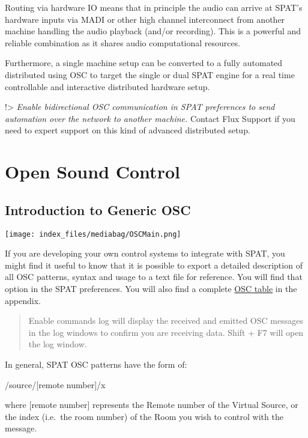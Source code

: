 \documentclass[
  letterpaper,
  DIV=11,
  numbers=noendperiod]{scrreport}
\begin{document}
Routing via hardware IO means that in principle the audio can arrive at
SPAT's hardware inputs via MADI or other high channel interconnect from
another machine handling the audio playback (and/or recording). This is
a powerful and reliable combination as it shares audio computational
resources.

Furthermore, a single machine setup can be converted to a fully
automated distributed using OSC to target the single or dual SPAT engine
for a real time controllable and interactive distributed hardware setup.

!\textgreater{} \emph{Enable bidirectional OSC communication in SPAT
preferences to send automation over the network to another machine.}
Contact Flux Support if you need to expert support on this kind of
advanced distributed setup.

\hypertarget{open-sound-control}{%
\chapter{Open Sound Control}\label{open-sound-control}}

\hypertarget{introduction-to-generic-osc}{%
\section{Introduction to Generic
OSC}\label{introduction-to-generic-osc}}

\texttt{[image: index\_files/mediabag/OSCMain.png]}

If you are developing your own control systems to integrate with SPAT,
you might find it useful to know that it is possible to export a
detailed description of all OSC patterns, syntax and usage to a text
file for reference. You will find that option in the SPAT preferences.
You will also find a complete \href{Appendix_C_OSC_Table.md}{OSC table}
in the appendix.

\begin{quote}
Enable commands log will display the received and emitted OSC messages
in the log windows to confirm you are receiving data. Shift + F7 will
open the log window.
\end{quote}

In general, SPAT OSC patterns have the form of:

/source/{[}remote number{]}/x

where {[}remote number{]} represents the Remote number of the Virtual
Source, or the index (i.e.~the room number) of the Room you wish to
control with the message.
\end{document}
